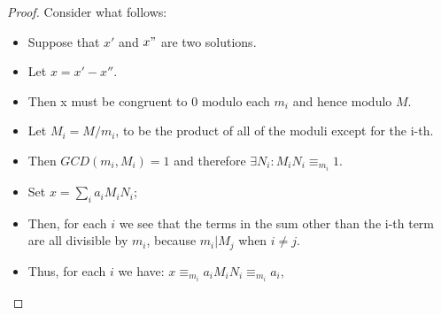 \documentclass[12pt, a4paper, english]{report}
\begin{document}
\begin{proof}
    Consider what follows:
    \begin{itemize}
        \item Suppose that $x'$ and $x"$ are two solutions.
        \item Let $x = x' - x''$.
        \item Then x must be congruent to $0$ modulo each $m_{i}$ and hence modulo $M$.
        \item Let $M_{i} = M/m_{i}$, to be the product of all of the moduli except for the i-th.
        \item Then $GCD(m_{i}, M_{i}) = 1$ and therefore $\exists N_{i}: M_{i}N_{i} \equiv_{m_{i}} 1$.
        \item Set $x = \sum_{i}a_{i}M_{i}N_{i}$;
        \item Then, for each $i$ we see that the terms in the sum other than the i-th term are all divisible by $m_{i}$, because $m_{i} | M_{j}$ when $i \neq j$.
        \item Thus, for each $i$ we have: $x \equiv_{m_{i}} a_{i}M_{i}N_{i} \equiv_{m_{i}} a_{i}$,
    \end{itemize}
\end{proof}
\end{document}

